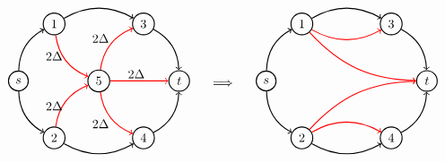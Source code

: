 \[\begin{tabular}{ccc}
    \begin{tikzpicture}[node distance={18mm}, thick , main/.style = {draw, circle}] 
    
    \node[main] (0) {$s$};
    \node[main] (1) at (1, 1.6) {1};
    \node[main] (2) at (1, -1.6) {2};
    \node[main] (3) at (3.5, 1.6) {3};
    \node[main] (4) at (3.5, -1.6) {4};
    \node[main] (6) at (2.25,0) {5};
    \node[main] (5) at (4.5, 0) {$t$};

    \draw[->] (0)[bend left] to (1);
    \draw[->] (0)[bend right] to (2);
    \draw[->] (1)[bend left] to (3);
    \draw[->] (2)[bend right] to (4);
    \draw[->] (4)[bend right] to (5);
    \draw[->] (3)[bend left] to (5);

    \draw[->] (1)[red, bend right] to (6);
    \draw[->] (6)[red, bend right] to (4);
    \draw[->] (6)[red, bend left] to (3);
    \draw[->] (2)[red, bend left] to (6);
    \draw[->] (6) [red] to (5);

    \node at (3.3,0.2) {$2\Delta$};
    \node at (2.3,1.2) {$2\Delta$};
    \node at (2.3,-1.2) {$2\Delta$};

    \node at (1,.7) {$2\Delta$};
    \node at (1,-.7) {$2\Delta$};
    

\end{tikzpicture}&\begin{tikzpicture}
    \node {$\implies$};%
    \node at (0,1.4) {};
    \node at (0,-1.95) {};
\end{tikzpicture}  &
\begin{tikzpicture}[node distance={19mm}, thick , main/.style = {draw, circle}] 
    \node[main] (0) {$s$};
    \node[main] (1) at (1, 1.6) {1};
    \node[main] (2) at (1, -1.6) {2};
    \node[main] (3) at (3.5, 1.6) {3};
    \node[main] (4) at (3.5, -1.6) {4};
    \node[main] (5) at (4.5, 0) {$t$};

    \draw[->] (0)[bend left] to (1);
    \draw[->] (0)[bend right] to (2);
    \draw[->] (1)[bend left] to (3);
    \draw[->] (2)[bend right] to (4);
    \draw[->] (4)[bend right] to (5);
    \draw[->] (3)[bend left] to (5);

    \draw[->] (1)[red, bend right] to (3);
    \draw[->] (2)[red, bend left] to (4);
    \draw[->] (2)[red, bend left = 23] to (5);
    \draw[->] (1)[red, bend right = 23] to (5);


\end{tikzpicture}
\end{tabular}\]

